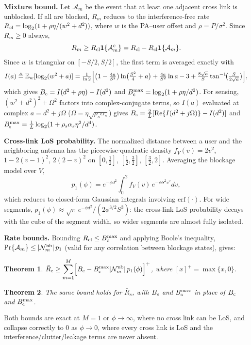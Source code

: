 \documentclass[11pt,a4paper]{article}
\newcommand{\Ex}{\mathbb{E}}
\newcommand{\ind}{\mathbf{1}}
\newtheorem{theorem}{Theorem}
\begin{document}
\textbf{Mixture bound.} Let $\mathcal A_m$ be the event that at least one adjacent cross link is unblocked. If all are blocked, $R_m$ reduces to the interference-free rate $R_{\rm cl}=\log_2(1+\rho\eta/(w^2+d^2))$, where $w$ is the PA--user offset and $\rho=P/\sigma^2$. Since $R_m\ge0$ always,
\begin{equation}
R_m\ge R_{\rm cl}\ind\{\mathcal A_m^c\}=R_{\rm cl}-R_{\rm cl}\ind\{\mathcal A_m\}.
\label{eq:mixture}
\end{equation}
Since $w$ is triangular on $[-S/2,S/2]$, the first term is averaged exactly with
\begin{equation}
I(a)\triangleq\Ex_w[\log_2(w^2+a)]=\tfrac1{\ln2}\Bigl[\bigl(1-\tfrac{4a}{S^2}\bigr)\ln\bigl(\tfrac{S^2}{4}+a\bigr)+\tfrac{4a}{S^2}\ln a-3+\tfrac{8\sqrt a}{S}\tan^{-1}\!\bigl(\tfrac{S}{2\sqrt a}\bigr)\Bigr],
\end{equation}
which gives $B_{\rm c}=I(d^2+\rho\eta)-I(d^2)$ and $B_{\rm c}^{\max}=\log_2(1+\rho\eta/d^2)$. For sensing, $(w^2+d^2)^2+\Omega^2$ factors into complex-conjugate terms, so $I(a)$ evaluated at complex $a=d^2+j\Omega$ ($\Omega=\eta\sqrt{\rho_s\alpha_s}$) gives $B_{\rm s}=\tfrac2L[\mathrm{Re}\{I(d^2+j\Omega)\}-I(d^2)]$ and $B_{\rm s}^{\max}=\tfrac1L\log_2(1+\rho_s\alpha_s\eta^2/d^4)$.

\textbf{Cross-link LoS probability.} The normalized distance between a user and the neighboring antenna has the piecewise-quadratic density $f_V(v)=2v^2$, $1-2(v-1)^2$, $2(2-v)^2$ on $[0,\tfrac12]$, $[\tfrac12,\tfrac32]$, $[\tfrac32,2]$. Averaging the blockage model over $V$,
\begin{equation}
p_1(\phi)=e^{-\phi d^2}\int_0^2 f_V(v)\,e^{-\phi S^2v^2}dv,
\label{eq:p1}
\end{equation}
which reduces to closed-form Gaussian integrals involving $\mathrm{erf}(\cdot)$. For wide segments, $p_1(\phi)\approx\sqrt\pi\,e^{-\phi d^2}/(2\phi^{3/2}S^3)$: the cross-link LoS probability decays with the cube of the segment width, so wider segments are almost fully isolated.

\textbf{Rate bounds.} Bounding $R_{\rm cl}\le B_{\rm c}^{\max}$ and applying Boole's inequality, $\Pr\{\mathcal A_m\}\le|\mathcal N_m^{\rm nb}|\,p_1$ (valid for any correlation between blockage states), gives:
\begin{theorem}
$\displaystyle\bar R_c\ge\sum_{m=1}^{M}\Bigl[B_{\rm c}-B_{\rm c}^{\max}|\mathcal N_m^{\rm nb}|\,p_1(\phi)\Bigr]^{+}$, where $[x]^+=\max\{x,0\}$.
\end{theorem}
\begin{theorem}
The same bound holds for $\bar R_s$, with $B_{\rm s}$ and $B_{\rm s}^{\max}$ in place of $B_{\rm c}$ and $B_{\rm c}^{\max}$.
\end{theorem}
Both bounds are exact at $M=1$ or $\phi\to\infty$, where no cross link can be LoS, and collapse correctly to $0$ as $\phi\to0$, where every cross link is LoS and the interference/clutter/leakage terms are never absent.
\end{document}
